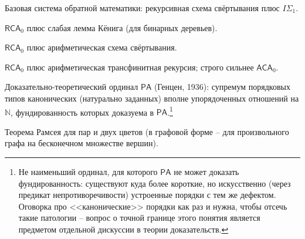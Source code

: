 \documentclass[12pt,a4paper]{article}
\theoremstyle{plain}
\theoremstyle{definition}
\newcommand{\PA}{\textsf{PA}}
\begin{document}
\begin{description}[leftmargin=3.2cm, style=nextline, font=\normalfont]
    \item[$\textsf{RCA}_0$] Базовая система обратной математики: рекурсивная схема свёртывания плюс $I\Sigma_1$.
    \item[$\textsf{WKL}_0$] $\textsf{RCA}_0$ плюс слабая лемма Кёнига (для бинарных деревьев).
    \item[$\textsf{ACA}_0$] $\textsf{RCA}_0$ плюс арифметическая схема свёртывания.
    \item[$\textsf{ATR}_0$] $\textsf{RCA}_0$ плюс арифметическая трансфинитная рекурсия; строго сильнее $\textsf{ACA}_0$.
    \item[$\varepsilon_0$] Доказательно-теоретический ординал $\PA$ (Генцен, 1936): супремум порядковых типов канонических (натурально заданных) вполне упорядоченных отношений на $\mathbb N$, фундированность которых доказуема в $\PA$.\footnote{Не наименьший ординал, для которого $\PA$ не может доказать фундированность: существуют куда более короткие, но искусственно (через предикат непротиворечивости) устроенные порядки с тем же дефектом. Оговорка про <<канонические>> порядки как раз и нужна, чтобы отсечь такие патологии -- вопрос о точной границе этого понятия является предметом отдельной дискуссии в теории доказательств.}
    \item[$RT^2_2$] Теорема Рамсея для пар и двух цветов (в графовой форме -- для произвольного графа на бесконечном множестве вершин).
\end{description}
\end{document}
